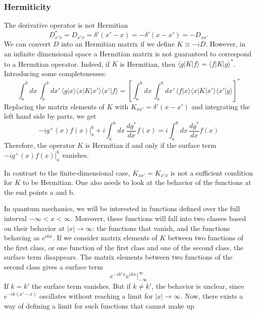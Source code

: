 \documentclass[11pt,fleqn]{book} %
\newcommand{\bra}[1]{\langle #1|}
\newcommand{\ket}[1]{| #1\rangle}
\newcommand{\scalar}[2]{\langle #1| #2\rangle}
\begin{document}
\subsubsection{Hermiticity}
The derivative operator is not Hermitian
\begin{equation*}
    D_{x'x}^* = D_{x'x} = \delta'(x'-x) = -\delta'(x-x') = -D_{xx'} 
\end{equation*}
We can convert $D$ into an Hermitian matrix if we define $K\equiv -iD$. However, in an infinite dimensional space a 
Hermitian matrix is not guaranteed to correspond to a Hermitian operator.
Indeed, if $K$ is Hermitian, then $\bra{g}K\ket{f} = \bra{f}K\ket{g}^*$. Introducing some completenesses:
\begin{equation*}
    \int_a^b\!\!dx\,\int_a^b\!\!dx'\,\scalar{g}{x}\bra{x}K\ket{x'}\scalar{x'}{f}  = 
    \left[\int_a^b\!\!dx\,\int_a^b\!\!dx'\,\scalar{f}{x}\bra{x}K\ket{x'}\scalar{x'}{g} \right]^*
\end{equation*}
Replacing the matrix elements of $K$ with $K_{xx'} = \delta'(x-x')$ and integrating the left hand side by parts, we get
\begin{equation*}
    -ig^+(x)f(x)\vert_a^b + i\int_a^b\!\!dx\,\frac{dg^*}{dx}f(x) = i\int_a^b\!\!dx\,\frac{dg^*}{dx}f(x)
\end{equation*}
Therefore, the operator $K$ is Hermitian if and only if the surface term $-ig^+(x)f(x)\vert_a^b $ vanishes.
\begin{remark}
    In contrast to the finite-dimensional case, $K_{xx'} = K_{x'x}$ is not a sufficient condition for
    $K$ to be Hermitian. One also needs to look at the behavior of the functions at the end points a and b. 
\end{remark}
In quantum mechanics, we will be interested in functions defined over the full interval $-\infty<x<\infty$. 
Moreover, these functions will fall into two classes based on their behavior at $|x|\to\infty$: 
the functions that vanish, and the functions behaving as $e^{ikx}$.
If we consider matrix elements of $K$ between two functions of the first class, or one function of the first class and
one of the second class, the surface term disappears. The matrix elements between two functions of the second class gives
a surface term 
\begin{equation*}
    e^{-ik'x}e^{ikx}\vert_{-\infty}^{\infty}
\end{equation*}
If $k=k'$ the surface term vanishes. But if $k\neq k'$, the behavior is unclear, since $e^{-ik(x'-x)}$ oscillates without
reaching a limit for $|x|\to\infty$. Now, there exists a way of defining a limit for such functions that cannot make up
\end{document}
